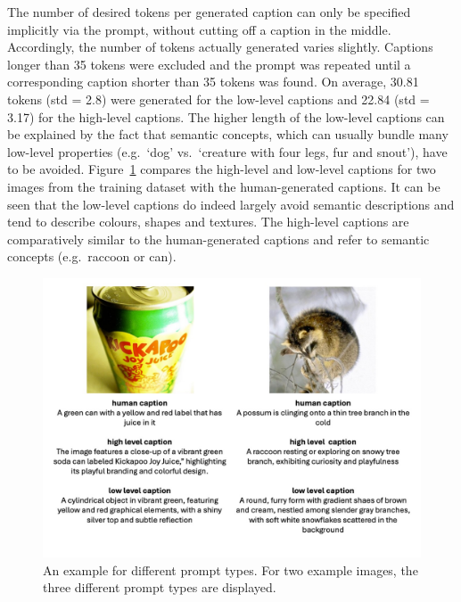 The number of desired tokens per generated caption can only be specified implicitly via the prompt, without cutting off a caption in the middle. Accordingly, the number of tokens actually generated varies slightly. Captions longer than 35 tokens were excluded and the prompt was repeated until a corresponding caption shorter than 35 tokens was found. On average, 30.81 tokens (std = 2.8) were generated for the low-level captions and 22.84 (std = 3.17) for the high-level captions. The higher length of the low-level captions can be explained by the fact that semantic concepts, which can usually bundle many low-level properties (e.g.\ `dog' vs.\ `creature with four legs, fur and snout'), have to be avoided. Figure~\ref{fig:aicap_caption_samples} compares the high-level and low-level captions for two images from the training dataset with the human-generated captions. It can be seen that the low-level captions do indeed largely avoid semantic descriptions and tend to describe colours, shapes and textures. The high-level captions are comparatively similar to the human-generated captions and refer to semantic concepts (e.g.\ raccoon or can).

\begin{figure}[ht]
    \centering
    \includegraphics[width=1\textwidth]{plots/aicap_samples.jpeg}
    \caption[Example for different image captions]{An example for different prompt types. For two example images, the three different prompt types are displayed. }\label{fig:aicap_caption_samples}
\end{figure}

